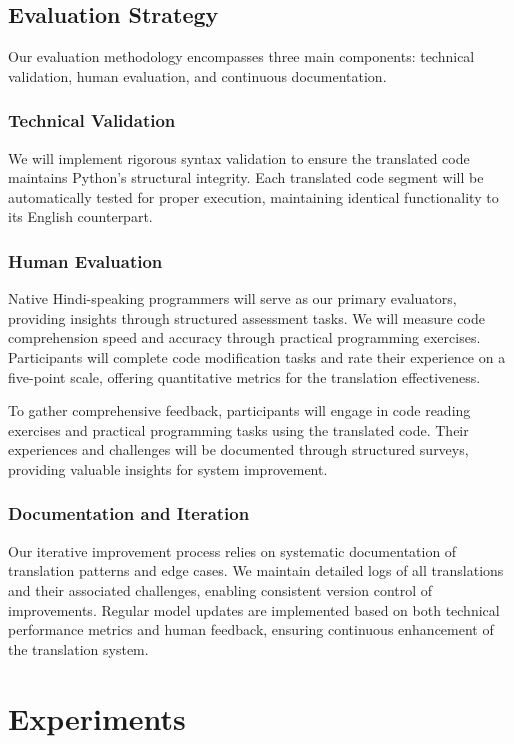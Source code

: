 \documentclass[9pt]{article}
\begin{document}
\subsection{Evaluation Strategy}

Our evaluation methodology encompasses three main components: technical validation, human evaluation, and continuous documentation.

\subsubsection{Technical Validation}
We will implement rigorous syntax validation to ensure the translated code maintains Python's structural integrity. Each translated code segment will be automatically tested for proper execution, maintaining identical functionality to its English counterpart.

\subsubsection{Human Evaluation}
Native Hindi-speaking programmers will serve as our primary evaluators, providing insights through structured assessment tasks. We will measure code comprehension speed and accuracy through practical programming exercises. Participants will complete code modification tasks and rate their experience on a five-point scale, offering quantitative metrics for the translation effectiveness.

To gather comprehensive feedback, participants will engage in code reading exercises and practical programming tasks using the translated code. Their experiences and challenges will be documented through structured surveys, providing valuable insights for system improvement.

\subsubsection{Documentation and Iteration}
Our iterative improvement process relies on systematic documentation of translation patterns and edge cases. We maintain detailed logs of all translations and their associated challenges, enabling consistent version control of improvements. Regular model updates are implemented based on both technical performance metrics and human feedback, ensuring continuous enhancement of the translation system.
\section{Experiments}
\end{document}
